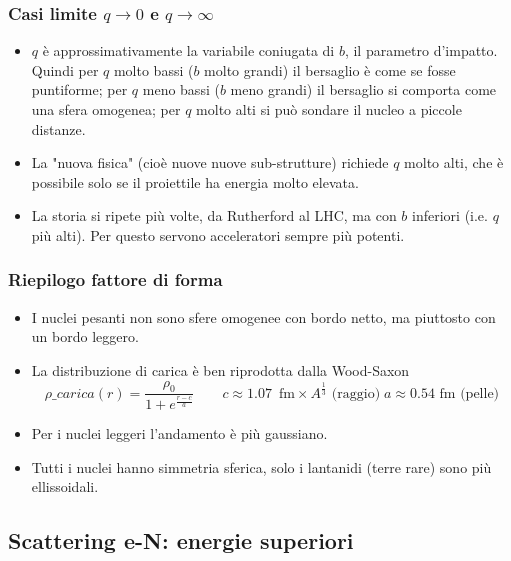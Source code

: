 \subsubsection{Casi limite $q\to0$ e $q\to\infty$}
\begin{itemize}
    \item $q$ è approssimativamente la variabile coniugata di $b$, il parametro d'impatto. Quindi per $q$ molto bassi ($b$ molto grandi) il bersaglio è come se fosse puntiforme; per $q$ meno bassi ($b$ meno grandi) il bersaglio si comporta come una sfera omogenea; per $q$ molto alti si può sondare il nucleo a piccole distanze.
    \item La "nuova fisica" (cioè nuove nuove sub-strutture) richiede $q$ molto alti, che è possibile solo se il proiettile ha energia molto elevata. 
    \item La storia si ripete più volte, da Rutherford al LHC, ma con $b$ inferiori (i.e. $q$ più alti). Per questo servono acceleratori sempre più potenti.
\end{itemize}
\subsubsection{Riepilogo fattore di forma}
\begin{itemize}
    \item I nuclei pesanti non sono sfere omogenee con bordo netto, ma piuttosto con un bordo leggero. 
    \item La distribuzione di carica è ben riprodotta dalla Wood-Saxon
    \begin{equation*}
    \rho\_{carica}(r)=\frac{\rho_0}{1+e^{\frac{r-c}a}}\qquad c\approx1.07\,\text{ fm}\times A^{\frac13}\text{ (raggio)}\;a\approx0.54\text{ fm (pelle)}
    \end{equation*}
    \item Per i nuclei leggeri l'andamento è più gaussiano.
    \item Tutti i nuclei hanno simmetria sferica, solo i lantanidi (terre rare) sono più ellissoidali.
\end{itemize}
\subsection{Scattering e-N: energie superiori}

